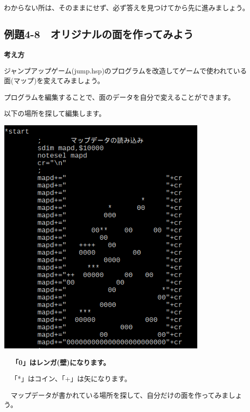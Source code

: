 \documentclass[a4paper,12pt]{jarticle}
\begin{document}
わからない所は、そのままにせず、必ず答えを見つけてから先に進みましょう。

\clearpage
\subsection{例題4-8　オリジナルの面を作ってみよう}
\bigskip
\bigskip

{\bfseries
考え方}

\bigskip

ジャンプアップゲーム(jump.hsp)のプログラムを改造してゲームで使われている面(マップ)を変えてみましょう。

プログラムを編集することで、面のデータを自分で変えることができます。

以下の場所を探して編集します。

\bigskip
\bigskip

\begin{minipage}{9.781cm}
\centering
{\upshape
\includegraphics[keepaspectratio,width=10.478cm,height=12.07cm]{text04-img/text04-img025.png}}
\end{minipage}

\bigskip
\bigskip
\bigskip

{\bfseries
\ \ 「0」はレンガ(壁)になります。

\ \ 「*」はコイン、「+」は矢になります。

\ \ マップデータが書かれている場所を探して、自分だけの面を作ってみましょう。}
\end{document}
